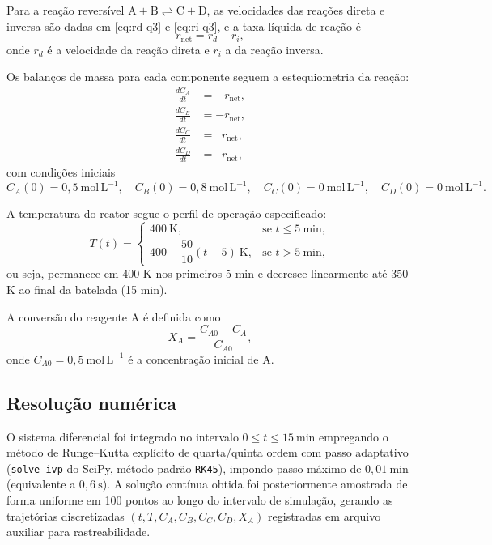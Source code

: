 \documentclass{article}
\begin{document}
Para a reação reversível $\mathrm{A} + \mathrm{B} \rightleftharpoons \mathrm{C} + \mathrm{D}$, as velocidades das reações direta e inversa são dadas em \eqref{eq:rd-q3} e \eqref{eq:ri-q3}, e a taxa líquida de reação é
\begin{equation}
  r_{\text{net}} = r_d - r_i, \label{eq:rnet-q3}
\end{equation}
onde $r_d$ é a velocidade da reação direta e $r_i$ a da reação inversa.

Os balanços de massa para cada componente seguem a estequiometria da reação:
\begin{align}
  \frac{dC_A}{dt} &= -r_{\text{net}}, \label{eq:balanco-A-q3} \\
  \frac{dC_B}{dt} &= -r_{\text{net}}, \label{eq:balanco-B-q3} \\
  \frac{dC_C}{dt} &= \;\;r_{\text{net}}, \label{eq:balanco-C-q3} \\
  \frac{dC_D}{dt} &= \;\;r_{\text{net}}, \label{eq:balanco-D-q3}
\end{align}
com condições iniciais
\begin{equation*}
  C_A(0) = 0{,}5\ \mathrm{mol\,L^{-1}}, \quad
  C_B(0) = 0{,}8\ \mathrm{mol\,L^{-1}}, \quad
  C_C(0) = 0\ \mathrm{mol\,L^{-1}}, \quad
  C_D(0) = 0\ \mathrm{mol\,L^{-1}}.
\end{equation*}

A temperatura do reator segue o perfil de operação especificado:
\begin{equation}
  T(t) = \begin{cases}
    400\ \mathrm{K}, & \text{se } t \leq 5\ \mathrm{min}, \\
    400 - \dfrac{50}{10}(t - 5)\ \mathrm{K}, & \text{se } t > 5\ \mathrm{min},
  \end{cases}
  \label{eq:temperatura-q3}
\end{equation}
ou seja, permanece em 400 K nos primeiros 5 min e decresce linearmente até 350 K ao final da batelada (15 min).

A conversão do reagente A é definida como
\begin{equation}
  X_A = \frac{C_{A0} - C_A}{C_{A0}}, \label{eq:conversao-q3}
\end{equation}
onde $C_{A0} = 0{,}5\ \mathrm{mol\,L^{-1}}$ é a concentração inicial de A.

\subsection*{Resolução numérica}
O sistema diferencial foi integrado no intervalo $0 \leq t \leq 15\ \mathrm{min}$ empregando o método de Runge--Kutta explícito de quarta/quinta ordem com passo adaptativo (\texttt{solve\_ivp} do SciPy, método padrão \texttt{RK45}), impondo passo máximo de $0{,}01\ \mathrm{min}$ (equivalente a $0{,}6\ \mathrm{s}$). A solução contínua obtida foi posteriormente amostrada de forma uniforme em 100 pontos ao longo do intervalo de simulação, gerando as trajetórias discretizadas $(t, T, C_A, C_B, C_C, C_D, X_A)$ registradas em arquivo auxiliar para rastreabilidade.
\end{document}
